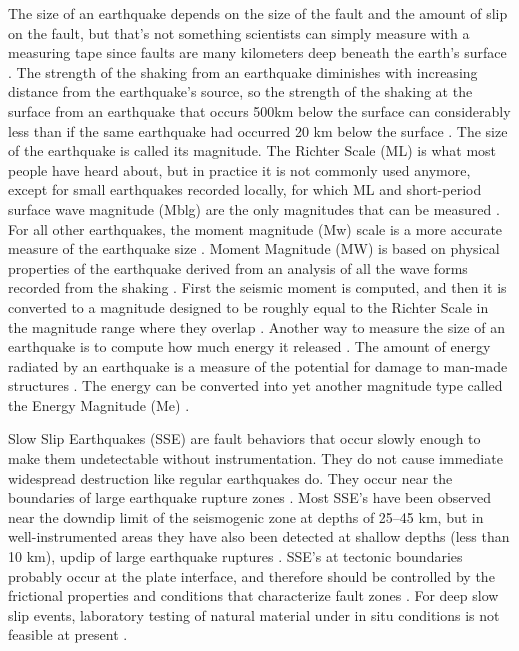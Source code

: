 \documentclass[]{llncs} %
\begin{document}
The size of an earthquake depends on the size of the fault and the amount of slip on the fault, but that’s not something scientists can simply measure with a measuring tape since faults are many kilometers deep beneath the earth’s surface \cite{Wald}. The strength of the shaking from an earthquake diminishes with increasing distance from the earthquake's source, so the strength of the shaking at the surface from an earthquake that occurs 500km below the surface can considerably less than if the same earthquake had occurred 20 km below the surface \cite{Wald}. The size of the earthquake is called its magnitude. The Richter Scale (ML) is what most people have heard about, but in practice it is not commonly used anymore, except for small earthquakes recorded locally, for which ML and short-period surface wave magnitude (Mblg) are the only magnitudes that can be measured \cite{Hayes}. For all other earthquakes, the moment magnitude (Mw) scale is a more accurate measure of the earthquake size \cite{Hayes}. Moment Magnitude (MW) is based on physical properties of the earthquake derived from an analysis of all the wave forms recorded from the shaking \cite{Hayes}. First the seismic moment is computed, and then it is converted to a magnitude designed to be roughly equal to the Richter Scale in the magnitude range where they overlap \cite{Hayes}. Another way to measure the size of an earthquake is to compute how much energy it released \cite{Hayes}. The amount of energy radiated by an earthquake is a measure of the potential for damage to man-made structures \cite{Hayes}. The energy can be converted into yet another magnitude type called the Energy Magnitude (Me) \cite{Hayes}. \par
Slow Slip Earthquakes (SSE) are fault behaviors that occur slowly enough to make them undetectable without instrumentation. They do not cause immediate widespread destruction like regular earthquakes do. They occur near the boundaries of large earthquake rupture zones \cite{Slip}. Most SSE's have been observed near the downdip limit of the seismogenic zone at depths of 25–45 km, but in well-instrumented areas they have also been detected at shallow depths (less than 10 km), updip of large earthquake ruptures \cite{Slip}. SSE's at tectonic boundaries probably occur at the plate interface, and therefore should be controlled by the frictional properties and conditions that characterize fault zones \cite{Slip}. For deep slow slip events, laboratory testing of natural material under in situ conditions is not feasible at present \cite{Slip}.  
\end{document}
